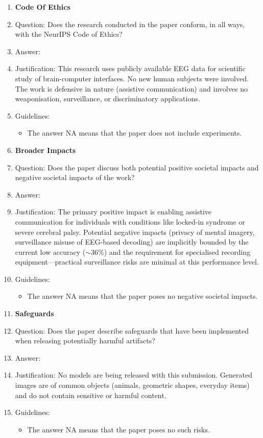 \documentclass{article}
\begin{document}
\begin{enumerate}
\item {\bf Code Of Ethics}
    \item[] Question: Does the research conducted in the paper conform, in all ways, with the NeurIPS Code of Ethics?
    \item[] Answer: \answerYes{}
    \item[] Justification: This research uses publicly available EEG data for scientific study of brain-computer interfaces. No new human subjects were involved. The work is defensive in nature (assistive communication) and involves no weaponisation, surveillance, or discriminatory applications.
    \item[] Guidelines:
    \begin{itemize}
        \item The answer NA means that the paper does not include experiments.
    \end{itemize}

\item {\bf Broader Impacts}
    \item[] Question: Does the paper discuss both potential positive societal impacts and negative societal impacts of the work?
    \item[] Answer: \answerYes{}
    \item[] Justification: The primary positive impact is enabling assistive communication for individuals with conditions like locked-in syndrome or severe cerebral palsy. Potential negative impacts (privacy of mental imagery, surveillance misuse of EEG-based decoding) are implicitly bounded by the current low accuracy ($\sim$36\%) and the requirement for specialised recording equipment---practical surveillance risks are minimal at this performance level.
    \item[] Guidelines:
    \begin{itemize}
        \item The answer NA means that the paper poses no negative societal impacts.
    \end{itemize}

\item {\bf Safeguards}
    \item[] Question: Does the paper describe safeguards that have been implemented when releasing potentially harmful artifacts?
    \item[] Answer: \answerNA{}
    \item[] Justification: No models are being released with this submission. Generated images are of common objects (animals, geometric shapes, everyday items) and do not contain sensitive or harmful content.
    \item[] Guidelines:
    \begin{itemize}
        \item The answer NA means that the paper poses no such risks.
    \end{itemize}


\end{enumerate}
\end{document}
